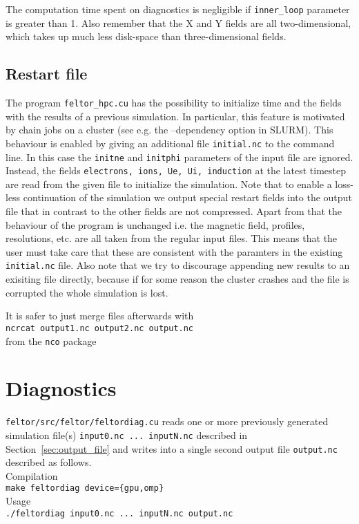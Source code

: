 The computation time spent on diagnostics is negligible if {\tt inner\_loop} parameter is greater than 1. Also
remember that the X and Y fields are all two-dimensional, which takes up much less disk-space than three-dimensional fields.
\subsection{Restart file} \label{sec:restart_file}
The program \texttt{feltor\_hpc.cu} has the possibility to initialize time and the fields with
the results of a previous simulation. In particular, this feature is motivated by chain jobs on a cluster
(see e.g. the --dependency option in SLURM).
This behaviour is enabled by giving an additional file \texttt{initial.nc}
to the command line. In this case the \texttt{initne} and \texttt{initphi} parameters of the input
file are ignored. Instead, the fields \texttt{electrons, ions, Ue, Ui, induction} at the latest timestep
are read from the given file to initialize the simulation.
Note that to enable a loss-less continuation of the simulation we output special restart fields into the output file that in contrast to the other fields
are not compressed.
Apart from that the behaviour of the program is unchanged i.e. the magnetic field, profiles, resolutions, etc.
are all taken from the regular input files. This means that the user must take care that these are consistent
with the paramters in the existing \texttt{initial.nc} file. Also note that we try to discourage
appending new results to an exisiting file directly,
because if for some reason the cluster crashes and the file is corrupted
the whole simulation is lost.
\begin{tcolorbox}[title=Note]
It is safer to just merge files afterwards with\\
\texttt{ncrcat output1.nc output2.nc output.nc}\\
from the \texttt{nco} package
\end{tcolorbox}
\section{Diagnostics}\label{sec:diagnostics}
\texttt{feltor/src/feltor/feltordiag.cu}
 reads one or more previously generated simulation file(s) \texttt{input0.nc ... inputN.nc} described in Section~\ref{sec:output_file} and writes into a single second output file \texttt{output.nc} described as follows. \\
Compilation\\
\texttt{make feltordiag device=\{gpu,omp\}} \\
Usage \\
\texttt{./feltordiag input0.nc ... inputN.nc output.nc} \\

